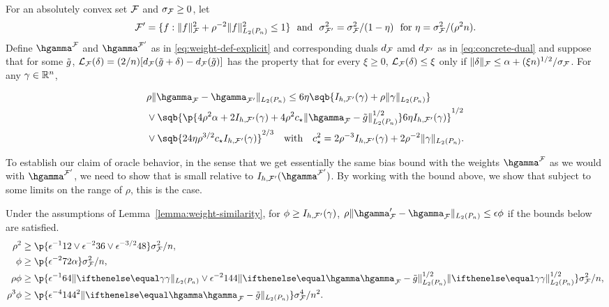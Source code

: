 \begin{lemm}
\label{lemma:weight-similarity}
For an absolutely convex set $\mathcal{F}$ and $\sigma_{\mathcal{F}} \ge 0$, 
let 
\[ \F' = \set{ f : \norm{f}_{\F}^2 + \rho^{-2}\norm{f}_{L_2(\Pn)}^2 \le 1} \ \text{ and }\ 
\sigma_{\F'}^2 = \sigma_{\F}^2 / (1-\eta) \ \text{ for } \eta = \sigma_{\F}^2 / (\rho^2 n). \]
Define $\hgamma^{\F}$ and $\hgamma^{\F'}$ as in \eqref{eq:weight-def-explicit}
and corresponding duals $d_{\mathcal{F}}$ amd $d_{\mathcal{F}'}$ as in \eqref{eq:concrete-dual}
and suppose that for some $\tilde{g}$, 
$\mathcal{L}_{\mathcal{F}}(\delta) = (2/n)[d_{\mathcal{F}}(\tilde{g} + \delta) - d_{\mathcal{F}}(\tilde{g})]$
has the property that for every $\xi \ge 0$, $\mathcal{L}_{\mathcal{F}}(\delta) \le \xi$ 
only if $\lVert\delta\rVert_{\mathcal{F}} \le \alpha + (\xi n)^{1/2}/\sigma_{\mathcal{F}}$. For any $\gamma \in \mathbb{R}^n$, 

\begin{align*}
&\rho\norm{\hgamma_{\F} - \hgamma_{\F'}}_{L_2(\Pn)} 
\le 6\eta\sqb{I_{h,\F'}(\gamma) + \rho\norm{\gamma}_{L_2(\Pn)}} \\
&\vee   \sqb{\p{4\rho^2\alpha  + 2I_{h,\F'}(\gamma) 
      + 4\rho^2c_{\star} \norm{\hgamma_{\F} - \gapprox}_{L_2(\Pn)}^{1/2}} 6\eta I_{h,\F'}(\gamma) }^{1/2} \\
&\vee   \sqb{24 \eta \rho^{3/2} c_{\star} I_{h,\F'}(\gamma)}^{2/3} \ \ \text{ with }\ \ c_{\star}^2 = 2\rho^{-3}I_{h,\F'}(\gamma) + 2\rho^{-2} \norm{\gamma}_{L_2(\Pn)}. 
\end{align*}
\end{lemm}

To establish our claim of oracle behavior, in the sense that we get essentially the same bias bound with the weights $\hgamma^{\F}$ 
as we would with $\hgamma^{\F'}$, we need to show that \smash{$\rho \norm{\hgamma_{\F}' - \hgamma_{\F}}_{L_2(\Pn)}$} is small relative to $I_{h,\F'}(\hgamma^{\F'})$.
By working with the bound above, we show that subject to some limits on the range of $\rho$, this is the case.

\begin{coro}
\label{coro:weight-similarity}
Under the assumptions of Lemma~\ref{lemma:weight-similarity},
for $\phi \ge I_{h,\mathcal{F}'}(\gamma)$,
$\rho \norm{\hgamma_{\F}' - \hgamma_{\F}}_{L_2(\Pn)} \le \epsilon \phi$ 
if the bounds below are satisfied.
\begin{equation}
\label{eq:rho-lb-implicit}
\begin{aligned}
\rho^2                   &\ge \p{\epsilon^{-1}12 \vee \epsilon^{-2} 36 \vee \epsilon^{-3/2}48 } \sigma_{\F}^2/n, \\
\phi       &\ge \p{\epsilon^{-2} 72 \alpha } \sigma_{\F}^2/n, \\
\rho \phi   &\ge  \p{\epsilon^{-1} 64 \norm{\riesz}_{L_2(\Pn)} 
    			     \vee \epsilon^{-2} 144\norm{\hriesz_{\F} - \gapprox}_{L_2(\Pn)}^{1/2} \norm{\riesz}_{L_2(\Pn)}^{1/2}} \sigma_{\F}^2/n, \\
\rho^3 \phi &\ge \p{\epsilon^{-4} 144^2 \norm{\hriesz_{\F} - \gapprox}_{L_2(\Pn)}} \sigma_{\F}^4/n^2.
\end{aligned}
\end{equation}
\end{coro}


